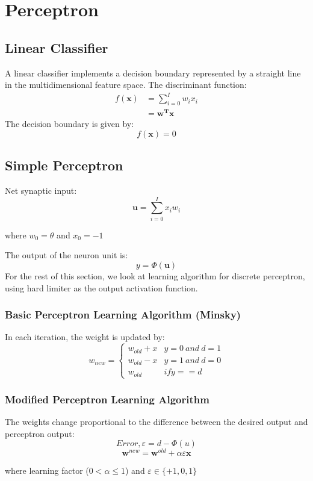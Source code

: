 \chapter{Perceptron}

\section{Linear Classifier}
A linear classifier implements a decision boundary represented by a straight line in the multidimensional feature space.
The discriminant function:
\begin{equation*}
\begin{split}
f(\mathbf{x}) &=\sum_{i=0}^{I} w_i x_i \\
&= \mathbf{w^{T}x}
\end{split}
\end{equation*}
The decision boundary is given by:
$$f(\mathbf{x})=0$$

\section{Simple Perceptron}
Net synaptic input:
$$\mathbf{u} = \sum_{i=0}^{I} x_i w_i $$
\begin{center}where $w_0 = \theta$ and $x_0=-1$ \end{center}
The output of the neuron unit is:
$$y = \Phi(\mathbf{u})$$
For the rest of this section, we look at learning algorithm for discrete perceptron, using hard limiter as the output activation function.

\subsection{Basic Perceptron Learning Algorithm (Minsky)}
In each iteration, the weight is updated by:
$$w_{new} =
\begin{cases} 
    w_{old} + x & y=0\ and\ d=1 \\
    w_{old} - x & y=1\ and\ d=0 \\
    w_{old} & if y==d
\end{cases}
$$

\subsection{Modified Perceptron Learning Algorithm}
The weights change proportional to the difference between the desired output and perceptron output:
$$Error, \varepsilon = d - \Phi(u)$$
$$\mathbf{w}^{new}=\mathbf{w}^{old} + \alpha \varepsilon \mathbf{x}$$
\begin{center} 
where learning factor ($0< \alpha \le 1$) and 
$\varepsilon \in \{+1, 0, 1\}$
\end{center}
